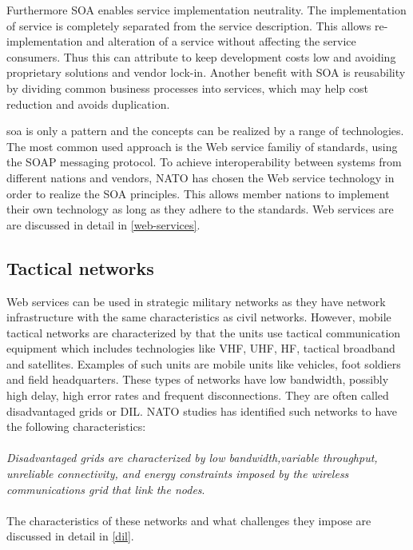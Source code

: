 \documentclass[USenglish]{ifimaster}
\begin{document}
Furthermore SOA enables service implementation neutrality. The implementation of
service is completely separated from the service description. This allows
re-implementation and alteration of a service without affecting the service
consumers. Thus this can attribute to keep development costs low and avoiding
proprietary solutions and vendor lock-in. Another benefit with SOA is
reusability by dividing common business processes into services, which may help
cost reduction and avoids duplication.

\gls{soa} is only a pattern and the concepts can be realized by a range of
technologies. The most common used approach is the Web service familiy of
standards, using the SOAP messaging protocol. To achieve interoperability
between systems from different nations and vendors, NATO has chosen the Web
service technology in order to realize the SOA principles. This allows member
nations to implement their own technology as long as they adhere to the
standards. Web services are are discussed in detail in \cref{web-services}.

\subsection{Tactical networks}
Web services can be used in strategic military networks as they have network
infrastructure with the same characteristics as civil networks. However, mobile
tactical networks are characterized by that the units use tactical communication
equipment which includes technologies like VHF, UHF, HF, tactical broadband and
satellites. Examples of such units are mobile units like vehicles, foot soldiers
and field headquarters. These types of networks have low bandwidth, possibly
high delay, high error rates and frequent disconnections. They are often called
disadvantaged grids or DIL. NATO studies has identified such networks to have
the following characteristics:
\paragraph{}
\textit{Disadvantaged grids are characterized by low bandwidth,variable
throughput, unreliable connectivity, and energy constraints imposed by the
wireless communications grid that link the
nodes}\cite{nato-disadvantaged-grids}.
\paragraph{}
The characteristics of these networks and what challenges they impose are
discussed in detail in \cref{dil}.
\end{document}
